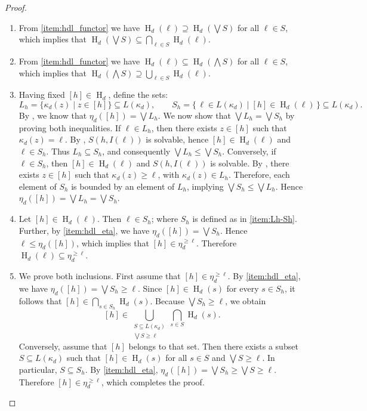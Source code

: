 \documentclass[a4paper,10pt]{article}
\DeclareMathOperator{\Ho}{H}
\begin{document}
\begin{proof}
\begin{enumerate}[label=(\roman*)]
\item From \cref{item:hdl_functor} we have \(\Ho_d(\ell) \supseteq \Ho_d \left(\bigvee S\right)\) for all \(\ell \in S\), which implies that \(\Ho_d(\bigvee S) \subseteq \bigcap_{\ell \in S} \Ho_d(\ell)\).

\item From \cref{item:hdl_functor} we have \(\Ho_d(\ell) \subseteq \Ho_d \left(\bigwedge S\right)\) for all \(\ell \in S\), which implies that \(\Ho_d(\bigwedge S) \supseteq \bigcup_{\ell \in S} \Ho_d(\ell)\).

\item\label{item:Lh-Sh} Having fixed \([h] \in \Ho_d\), define the sets:
\[
L_h = \big\{\kappa_d(z) \mid z \in [h]\big\} \subseteq L(\kappa_d), 
\qquad 
S_h = \big\{\, \ell \in L(\kappa_d) \mid [h] \in \Ho_d(\ell) \,\big\} \subseteq L(\kappa_d).
\]
By , we know that \(\eta_d([h])=\bigvee L_h\). We now show that \(\bigvee L_h = \bigvee S_h\) by proving both inequalities.
If \(\ell \in L_h\), then there exists \(z \in [h]\) such that \(\kappa_d(z) = \ell\). By , \(S(h,I(\ell))\) is solvable, hence \([h] \in \Ho_d(\ell)\) and \(\ell \in S_h\). Thus \(L_h \subseteq S_h\), and consequently \(\bigvee L_h \leq \bigvee S_h\). Conversely, if \(\ell \in S_h\), then \([h] \in \Ho_d(\ell)\) and \(S(h,I(\ell))\) is solvable. By , there exists \(z \in [h]\) such that \(\kappa_d(z) \geq \ell\), with \(\kappa_d(z) \in L_h\). Therefore, each element of \(S_h\) is bounded by an element of \(L_h\), implying \(\bigvee S_h \leq \bigvee L_h\). Hence \(\eta_d([h])=\bigvee L_h = \bigvee S_h\).
\item Let \([h] \in \Ho_d(\ell)\).
Then $\ell \in S_h$; where $S_h$ is defined as in \cref{item:Lh-Sh}. 
Further, by \cref{item:hdl_eta}, we have \(\eta_d([h])=\bigvee S_{h}\). Hence \(\ell \leq \eta_d([h])\), which implies that \([h] \in \eta_d^{\geq \ell}\). Therefore \(\Ho_d(\ell) \subseteq \eta_d^{\geq \ell}\).
\item We prove both inclusions. First assume that \([h] \in \eta_d^{\geq \ell}\).
By \cref{item:hdl_eta}, we have \(\eta_d([h])=\bigvee S_h \geq \ell\). Since \([h] \in \Ho_d(s)\) for every \(s \in S_h\), it follows that \([h] \in \bigcap_{s \in S_h} \Ho_d(s)\). Because \(\bigvee S_h \geq \ell\), we obtain
\[
[h] \in 
\bigcup_{\substack{S \subseteq L(\kappa_d) \\ \bigvee S \geq \ell}}
\bigcap_{s \in S} \Ho_d(s).
\]
Conversely, assume that \([h]\) belongs to that set.
Then there exists a subset \(S \subseteq L(\kappa_d)\) such that \([h] \in \Ho_d(s)\) for all \(s \in S\) and \(\bigvee S \geq \ell\).
In particular, $S \subseteq S_h$.
By \cref{item:hdl_eta},
\(\eta_d([h])= \bigvee S_h\geq \bigvee S\geq \ell.\)
Therefore \([h] \in \eta_d^{\geq \ell}\), which completes the proof. \qedhere
\end{enumerate}
\end{proof}
\end{document}
